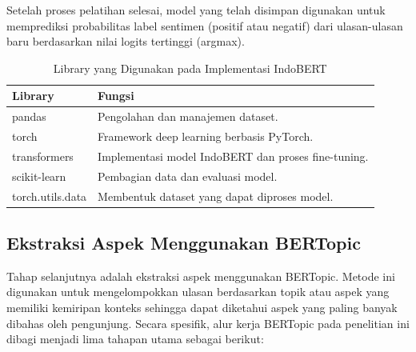 Setelah proses pelatihan selesai, model yang telah disimpan digunakan untuk memprediksi probabilitas label sentimen (positif atau negatif) dari ulasan-ulasan baru berdasarkan nilai logits tertinggi (argmax).

\begin{table}[H]
\centering
\caption{Library yang Digunakan pada Implementasi IndoBERT}
\begin{tabular}{|l|p{9cm}|}
\hline
\textbf{Library} & \textbf{Fungsi} \\
\hline
pandas & Pengolahan dan manajemen dataset. \\
\hline
torch & Framework deep learning berbasis PyTorch. \\
\hline
transformers & Implementasi model IndoBERT dan proses fine-tuning. \\
\hline
scikit-learn & Pembagian data dan evaluasi model. \\
\hline
torch.utils.data & Membentuk dataset yang dapat diproses model. \\
\hline
\end{tabular}
\end{table}

\subsection{Ekstraksi Aspek Menggunakan BERTopic}

Tahap selanjutnya adalah ekstraksi aspek menggunakan BERTopic. Metode ini digunakan untuk mengelompokkan ulasan berdasarkan topik atau aspek yang memiliki kemiripan konteks sehingga dapat diketahui aspek yang paling banyak dibahas oleh pengunjung. Secara spesifik, alur kerja BERTopic pada penelitian ini dibagi menjadi lima tahapan utama sebagai berikut:

